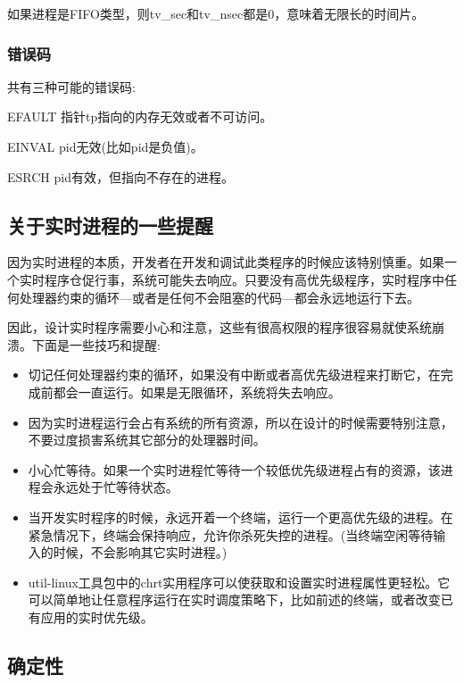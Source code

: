   如果进程是FIFO类型，则tv\_sec和tv\_nsec都是0，意味着无限长的时间片。

\subsubsection{错误码}

  共有三种可能的错误码:

\begin{eqlist*}
\item[EFAULT] 指针tp指向的内存无效或者不可访问。
\item[EINVAL] pid无效(比如pid是负值)。
\item[ESRCH] pid有效，但指向不存在的进程。
\end{eqlist*}

\subsection{关于实时进程的一些提醒}

  因为实时进程的本质，开发者在开发和调试此类程序的时候应该特别慎重。如果一个实时程序仓促行事，系统可能失去响应。只要没有高优先级程序，实时程序中任何处理器约束的循环---或者是任何不会阻塞的代码---都会永远地运行下去。

  因此，设计实时程序需要小心和注意，这些有很高权限的程序很容易就使系统崩溃。下面是一些技巧和提醒:

\begin{itemize}
\item 切记任何处理器约束的循环，如果没有中断或者高优先级进程来打断它，在完成前都会一直运行。如果是无限循环，系统将失去响应。
\item 因为实时进程运行会占有系统的所有资源，所以在设计的时候需要特别注意，不要过度损害系统其它部分的处理器时间。
\item 小心忙等待。如果一个实时进程忙等待一个较低优先级进程占有的资源，该进程会永远处于忙等待状态。
\item 当开发实时程序的时候，永远开着一个终端，运行一个更高优先级的进程。在紧急情况下，终端会保持响应，允许你杀死失控的进程。(当终端空闲等待输入的时候，不会影响其它实时进程。)
\item util-linux工具包中的chrt实用程序可以使获取和设置实时进程属性更轻松。它可以简单地让任意程序运行在实时调度策略下，比如前述的终端，或者改变已有应用的实时优先级。
\end{itemize}

\subsection{确定性}

